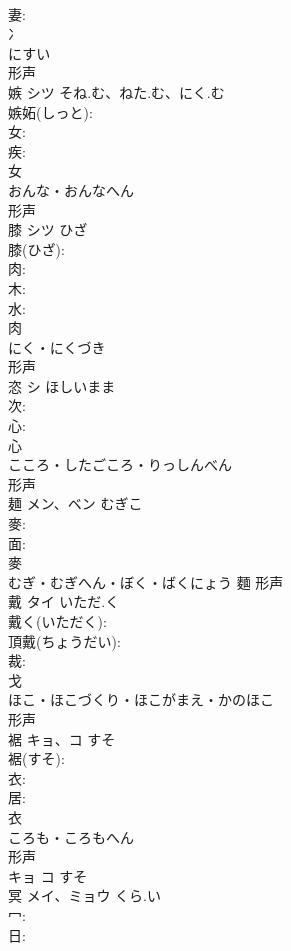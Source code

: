 \documentclass[8pt]{extreport}
\begin{document}
\begin{CJK}{UTF8}{min}
\\	妻: 
\\	冫	
\\	にすい	
\\	形声 
\\	嫉	シツ	そね.む、ねた.む、にく.む		
\\	嫉妬(しっと): 
\\	女: 
\\	疾: 
\\	女	
\\	おんな・おんなへん	
\\	形声 
\\	膝	シツ	ひざ		
\\	膝(ひざ): 
\\	肉: 
\\	木: 
\\	水: 
\\	肉	
\\	にく・にくづき	
\\	形声 
\\	恣	シ	ほしいまま		
\\	次: 
\\	心: 
\\	心	
\\	こころ・したごころ・りっしんべん	
\\	形声 
\\	麺	メン、ベン	むぎこ		
\\	麥: 
\\	面: 
\\	麥	
\\	むぎ・むぎへん・ぼく・ばくにょう	麵	形声 
\\	戴	タイ	いただ.く		
\\	戴く(いただく): 
\\	頂戴(ちょうだい): 
\\	裁: 
\\	戈	
\\	ほこ・ほこづくり・ほこがまえ・かのほこ	
\\	形声 
\\	裾	キョ、コ	すそ		
\\	裾(すそ): 
\\	衣: 
\\	居: 
\\	衣	
\\	ころも・ころもへん	
\\	形声 
\\	キョ コ すそ 
\\	冥	メイ、ミョウ	くら.い		
\\	冖: 
\\	日: 

\end{CJK}
\end{document}
